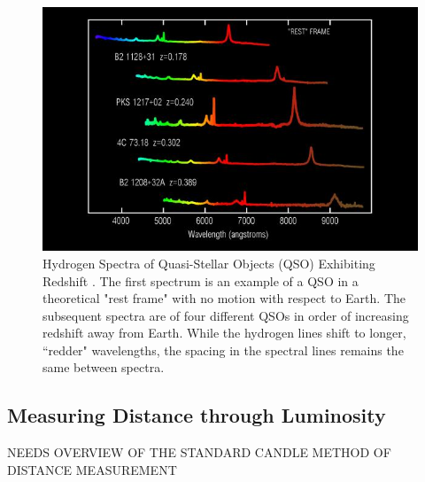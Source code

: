 \begin{figure}[t]
	\centering
	\includegraphics[width=\textwidth]{redshift}
	\caption{Hydrogen Spectra of Quasi-Stellar Objects (QSO) Exhibiting Redshift \cite{SpectralRedshift}. The first spectrum is an example of a QSO in a theoretical "rest frame" with no motion with respect to Earth. The subsequent spectra are of four different QSOs in order of increasing redshift away from Earth. While the hydrogen lines shift to longer, ``redder" wavelengths, the spacing in the spectral lines remains the same between spectra.}
	\label{fig:redshift}
\end{figure}


\subsection{Measuring Distance through Luminosity}

NEEDS OVERVIEW OF THE STANDARD CANDLE METHOD OF DISTANCE MEASUREMENT

